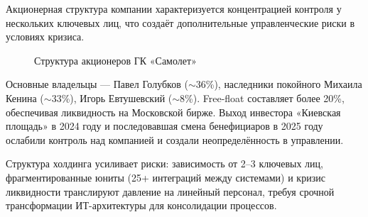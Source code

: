 \documentclass[12pt,a4paper]{article}
\begin{document}
Акционерная структура компании характеризуется концентрацией контроля у нескольких ключевых лиц, что создаёт дополнительные управленческие риски в условиях кризиса.

\begin{figure}[H]
\centering
{}
\caption{Структура акционеров ГК «Самолет»}
\label{fig:shareholders}
\end{figure}

Основные владельцы --- Павел Голубков ($\sim$36\%), наследники покойного Михаила Кенина ($\sim$33\%), Игорь Евтушевский ($\sim$8\%). Free-float составляет более 20\%, обеспечивая ликвидность на Московской бирже. Выход инвестора «Киевская площадь» в 2024 году и последовавшая смена бенефициаров в 2025 году ослабили контроль над компанией и создали неопределённость в управлении.

Структура холдинга усиливает риски: зависимость от 2--3 ключевых лиц, фрагментированные юниты (25+ интеграций между системами) и кризис ликвидности транслируют давление на линейный персонал, требуя срочной трансформации ИТ-архитектуры для консолидации процессов.
\end{document}
